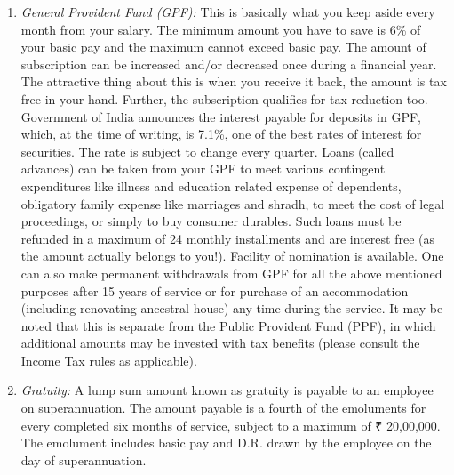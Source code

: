 \documentclass[
  10pt,
  a5paper,
  10pt,
  openany]{amsbook}
\begin{document}
\begin{enumerate}
  In case an employee dies while in service the rate of family pension
  will be 50\% of the last salary drawn by the employee for a period of
  10 years, after which it would revert to the regular rate stated
  above. In case an employee dies after retirement but before reaching
  67 years of age, the family pension till such time will be equal to
  the pension that would have been payable had the employee not so died.
  In addition, applicable D.R. is also payable. Note that family pension
  amount is not affected by any commutation that the employee might have
  done. Family pension also accelerates with age beyond 80 as for
  regular pension.
\item
  \emph{General Provident Fund (GPF):} This is basically what you keep
  aside every month from your salary. The minimum amount you have to
  save is 6\% of your basic pay and the maximum cannot exceed basic pay.
  The amount of subscription can be increased and/or decreased once
  during a financial year. The attractive thing about this is when you
  receive it back, the amount is tax free in your hand. Further, the
  subscription qualifies for tax reduction too. Government of India
  announces the interest payable for deposits in GPF, which, at the time
  of writing, is 7.1\%, one of the best rates of interest for
  securities. The rate is subject to change every quarter. Loans (called
  advances) can be taken from your GPF to meet various contingent
  expenditures like illness and education related expense of dependents,
  obligatory family expense like marriages and shradh, to meet the cost
  of legal proceedings, or simply to buy consumer durables. Such loans
  must be refunded in a maximum of 24 monthly installments and are
  interest free (as the amount actually belongs to you!). Facility of
  nomination is available. One can also make permanent withdrawals from
  GPF for all the above mentioned purposes after 15 years of service or
  for purchase of an accommodation (including renovating ancestral
  house) any time during the service. It may be noted that this is
  separate from the Public Provident Fund (PPF), in which additional
  amounts may be invested with tax benefits (please consult the Income
  Tax rules as applicable).
\item
  \emph{Gratuity:} A lump sum amount known as gratuity is payable to an
  employee on superannuation. The amount payable is a fourth of the
  emoluments for every completed six months of service, subject to a
  maximum of ₹ 20,00,000. The emolument includes basic pay and D.R.
  drawn by the employee on the day of superannuation.
\end{enumerate}
\end{document}
